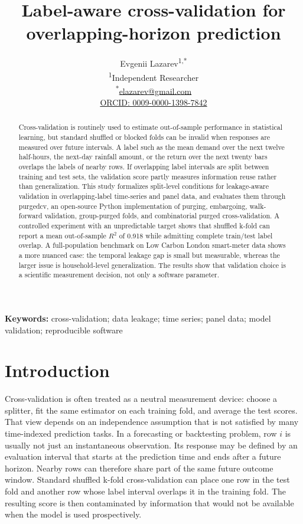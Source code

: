 \documentclass[10pt]{article}
\title{Label-aware cross-validation for overlapping-horizon prediction}
\author{
Evgenii Lazarev\textsuperscript{1,*}\\
\textsuperscript{1}Independent Researcher\\
\textsuperscript{*}\href{mailto:elazarev@gmail.com}{elazarev@gmail.com}\\
\href{https://orcid.org/0009-0000-1398-7842}{ORCID: 0009-0000-1398-7842}
}
\date{}
\newcommand{\pcv}{\textsf{purgedcv}}
\begin{document}
\maketitle

\begin{abstract}
Cross-validation is routinely used to estimate out-of-sample performance in
statistical learning, but standard shuffled or blocked folds can be invalid when
responses are measured over future intervals. A label such as the mean demand
over the next twelve half-hours, the next-day rainfall amount, or the return
over the next twenty bars overlaps the labels of nearby rows. If overlapping
label intervals are split between training and test sets, the validation score
partly measures information reuse rather than generalization. This study
formalizes split-level conditions for leakage-aware validation in
overlapping-label time-series and panel data, and evaluates them through
\pcv, an open-source Python implementation of purging, embargoing,
walk-forward validation, group-purged folds, and combinatorial purged
cross-validation. A controlled experiment with an unpredictable target shows
that shuffled k-fold can report a mean out-of-sample $R^2$ of 0.918 while
admitting complete train/test label overlap. A full-population benchmark on Low
Carbon London smart-meter data shows a more nuanced case: the temporal leakage
gap is small but measurable, whereas the larger issue is household-level
generalization. The results show that validation choice is a scientific
measurement decision, not only a software parameter.
\end{abstract}

\noindent\textbf{Keywords:} cross-validation; data leakage; time series; panel
data; model validation; reproducible software

\section{Introduction}

Cross-validation is often treated as a neutral measurement device: choose a
splitter, fit the same estimator on each training fold, and average the test
scores. That view depends on an independence assumption that is not satisfied by
many time-indexed prediction tasks. In a forecasting or backtesting problem, row
$i$ is usually not just an instantaneous observation. Its response may be
defined by an evaluation interval that starts at the prediction time and ends
after a future horizon. Nearby rows can therefore share part of the same future
outcome window. Standard shuffled k-fold cross-validation can place one row in
the test fold and another row whose label interval overlaps it in the training
fold. The resulting score is then contaminated by information that would not be
available when the model is used prospectively.
\end{document}
